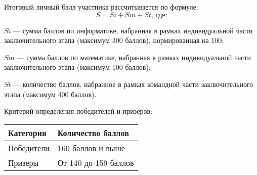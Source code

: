 Итоговый личный балл участника рассчитывается по формуле:
$$S = Si + Sm + St, \: \text{где:}$$
 
$Si$ — сумма баллов по информатике, набранная в рамках индивидуальной части заключительного этапа (максимум 300 баллов), нормированная на 100;

$Sm$ — сумма баллов по математике, набранная в рамках индивидуальной части заключительного этапа (максимум 100 баллов); 

$St$ — количество баллов, набранное в рамках командной части заключительного этапа (максимум 400 баллов).

Критерий определения победителей и призеров:
\begin{center}
    \begin{tabular}{|l|l|}
        \hline
        Категория&Количество баллов\\
        \hline
        Победители&160 баллов и выше\\
        \hline
        Призеры&От 140 до 159 баллов\\
        \hline
    \end{tabular}
\end{center}
